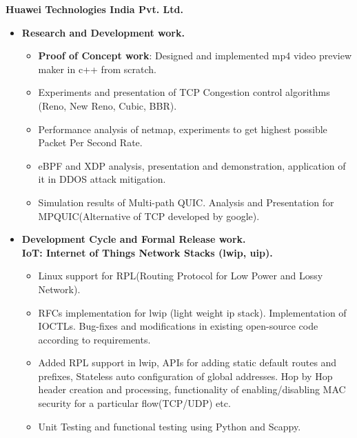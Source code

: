 \textbf{ Huawei Technologies India Pvt. Ltd.}
\begin{itemize}
	\item \textbf{Research and Development work.}\\[-0.6cm]
	\begin{itemize}  	
		\item {\bf Proof of Concept work}: Designed and implemented mp4 video preview maker in c++ from scratch. \\[-0.5cm]
		\item Experiments and presentation of TCP Congestion control algorithms (Reno, New Reno, Cubic, BBR).\\[-0.5cm]
		\item Performance analysis of netmap, experiments to get highest possible Packet Per Second Rate.\\[-0.5cm]
		\item eBPF and XDP analysis, presentation and demonstration, application of it in DDOS attack mitigation.\\[-0.5cm] 
		\item Simulation results of Multi-path QUIC. Analysis and Presentation for MPQUIC(Alternative of TCP developed by google).\\[-0.5cm]
	\end{itemize}
	\item \textbf{Development Cycle and Formal Release work.} \\
	\textbf{IoT: Internet of Things Network Stacks (lwip, uip).}\\[-0.6cm]
	\begin{itemize} 
	 \item Linux support for RPL(Routing Protocol for Low Power and Lossy Network).\\[-0.5cm]
	 \item RFCs implementation for lwip (light weight ip stack). Implementation of IOCTLs. Bug-fixes and modifications in existing open-source code according to requirements.\\[-0.5cm]
	 \item Added RPL support in lwip, APIs for adding static default routes and prefixes, Stateless auto configuration of global addresses. Hop by Hop header creation and processing, functionality of enabling/disabling MAC security for a particular flow(TCP/UDP) etc.\\[-0.5cm]
	 \item Unit Testing and functional testing using Python and Scappy.\\[-0.5cm]

\end{itemize}
\end{itemize}
